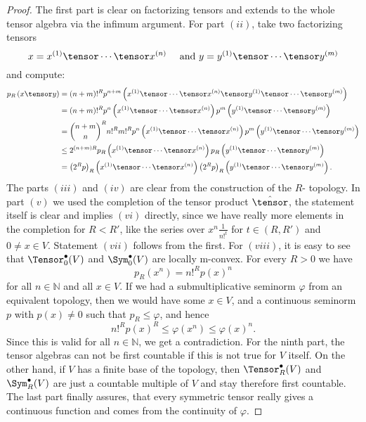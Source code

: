 \begin{proof}
	The first part is clear on factorizing tensors and extends to the whole 
	tensor algebra via the infimum argument. For part $(ii)$, take two 
	factorizing tensors
	\begin{equation*}
		x
		=
		x^{(1)} \tensor \cdots \tensor x^{(n)}
		\quad \text{ and }
		y
		=
		y^{(1)} \tensor \cdots \tensor y^{(m)}
	\end{equation*}
	and compute:
	\begin{align*}
		p_R \left(
			x \tensor y
		\right)
		& =
		(n + m)!^R
		p^{n + m} \left(
			x^{(1)} \tensor \cdots \tensor x^{(n)}
			\tensor
			y^{(1)} \tensor \cdots \tensor y^{(m)}
		\right)
		\\
		& =
		(n + m)!^R
		p^n \left(
			x^{(1)} \tensor \cdots \tensor x^{(n)}
		\right)
		p^m \left(
			y^{(1)} \tensor \cdots \tensor y^{(m)}
		\right)
		\\
		& =
		\binom{n + m}{n}^R
		n!^R m!^R
		p^n \left(
			x^{(1)} \tensor \cdots \tensor x^{(n)}
		\right)
		p^m \left(
			y^{(1)} \tensor \cdots \tensor y^{(m)}
		\right)
		\\
		& \leq
		2^{(n + m) R}
		p_R \left( x^{(1)} \tensor \cdots \tensor x^{(n)} \right)
		p_R \left( y^{(1)} \tensor \cdots \tensor y^{(m)} \right)
		\\
		& =
		\left( 2^R p\right)_R 
		\left( x^{(1)} \tensor \cdots \tensor x^{(n)} \right)
		\left( 2^R p \right)_R 
		\left( y^{(1)} \tensor \cdots \tensor y^{(m)} \right).
	\end{align*}
	The parts $(iii)$ and $(iv)$ are clear from the construction of the 
	$R$-	topology. In part $(v)$ we used the completion of the tensor product 
	$\hat{\tensor}$, the statement itself is clear and implies $(vi)$ 
	directly, since we have really more elements in the completion for $R < 
	R'$, like the series over $x^{n} \frac{1}{n!^t}$ for $t \in (R, R')$ and 
	$0 \neq x \in V$. Statement $(vii)$ follows from the first. For $(viii)$, 
	it is easy to see that $\Tensor_0^{\bullet}(V)$ and $\Sym_0^{\bullet}(V)$ 
	are locally m-convex. For every $R > 0$ we have
	\begin{equation*}
		p_R \left(x^n \right)
		=
		n!^R
		p(x)^n
	\end{equation*}
	for all $n \in \mathbb{N}$ and all $x \in V$. If we had a 
	submultiplicative seminorm $\varphi$ from an equivalent topology, 
	then we would have some $x \in V$, and a continuous seminorm $p$ with 
	$p(x) \neq 0$ such that $p_R \leq \varphi$, and hence
	\begin{equation*}
		n!^R p(x)^R
		\leq
		\varphi \left(x^n\right)
		\leq
		\varphi\left(x\right)^n.
	\end{equation*}
	Since this is valid for all $n \in \mathbb{N}$, we get a contradiction.
	For the ninth part, the tensor algebras can not be first countable if this 
	is not true for $V$ itself. On the other hand, if $V$ has a finite base of 
	the topology, then $\Tensor_R^{\bullet}(V)$ and $\Sym_R^{\bullet}(V)$ are 
	just a countable multiple of $V$ and stay therefore first countable.
	The last part finally assures, that every symmetric tensor really gives a 
	continuous function and comes from the continuity of $\varphi$.
\end{proof}
